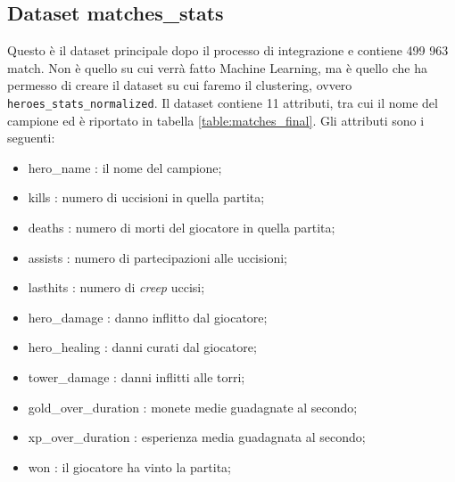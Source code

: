\documentclass[a4paper,12pt,openany,oneside]{book}
\begin{document}
\subsection{Dataset matches\_stats}
Questo è il dataset principale dopo il processo di integrazione e contiene 499 963 match. Non è quello su cui verrà fatto Machine Learning, ma è quello che ha permesso di creare il dataset su cui faremo il clustering, ovvero \verb|heroes_stats_normalized|. Il dataset contiene 11 attributi, tra cui il nome del campione ed è riportato in tabella \ref{table:matches_final}. Gli attributi sono i seguenti:
\begin{itemize}
	\item hero\_name : il nome del campione;
	\item kills : numero di uccisioni in quella partita;
	\item deaths : numero di morti del giocatore in quella partita;
	\item assists : numero di partecipazioni alle uccisioni; 
	\item lasthits : numero di \textit{creep} uccisi;
	\item hero\_damage : danno inflitto dal giocatore;
	\item hero\_healing : danni curati dal giocatore;
	\item tower\_damage : danni inflitti alle torri;
	\item gold\_over\_duration : monete medie guadagnate al secondo;
	\item xp\_over\_duration : esperienza media guadagnata al secondo;
	\item won : il giocatore ha vinto la partita;
\end{itemize}
\end{document}
